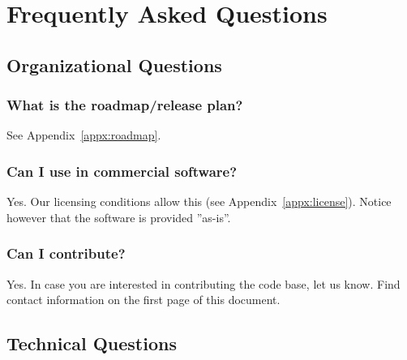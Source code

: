 %
% 
%
%
%

\section{Frequently Asked Questions}
\label{appx:faq}

\subsection{Organizational Questions}

\subsubsection{What is the \xme roadmap/release plan?}

See Appendix~\ref{appx:roadmap}.

\subsubsection{Can I use \xme in commercial software?}

Yes. Our licensing conditions allow this (see Appendix~\ref{appx:license}).
Notice however that the software is provided ''as-is''.

\subsubsection{Can I contribute?}

Yes. In case you are interested in contributing the \xme code base, let us know.
Find contact information on the first page of this document.

\subsection{Technical Questions}

